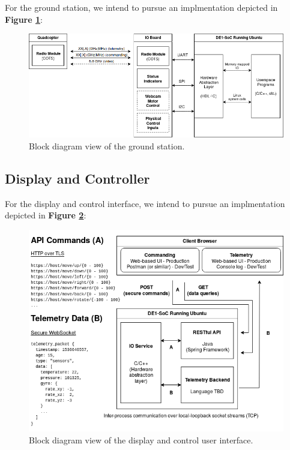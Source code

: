 \documentclass{article}
\begin{document}
For the ground station, we intend to pursue an implmentation depicted in
\textbf{Figure \ref{fig:ground_station}}:

\begin{figure}[H]
	\centering
	\includegraphics[width=\linewidth]{../src/im/ground_station}
	\caption{Block diagram view of the ground station.}
	\label{fig:ground_station}
\end{figure}


\pagebreak

\subsection{Display and Controller}

For the display and control interface, we intend to pursue an
implmentation depicted in \textbf{Figure \ref{fig:display_controller}}:

\begin{figure}[H]
	\centering
	\includegraphics[width=\linewidth]{../src/im/display_controller}
	\caption{Block diagram view of the display and control user
		interface.}
	\label{fig:display_controller}
\end{figure}
\end{document}
